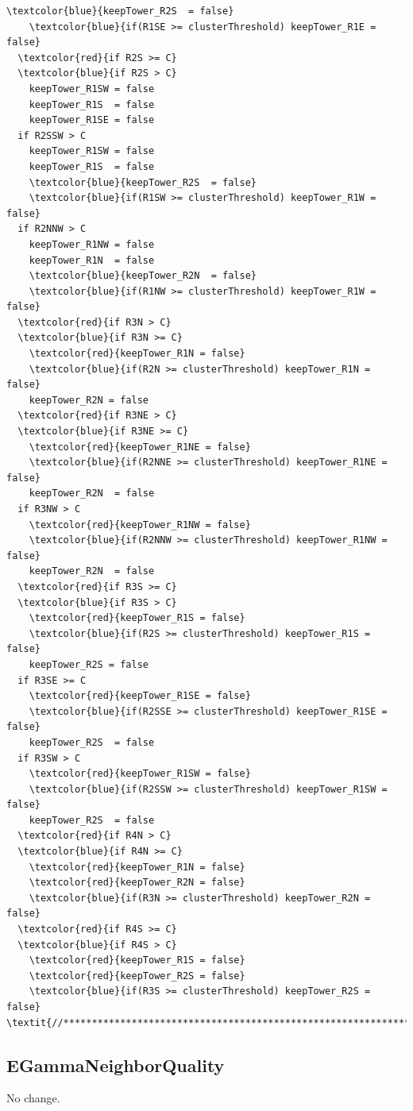 \documentclass[a4paper, 12pt]{article}
\begin{document}
\begin{Verbatim}[label={Sharing updates}]
    \textcolor{blue}{keepTower_R2S  = false}
    \textcolor{blue}{if(R1SE >= clusterThreshold) keepTower_R1E = false}
  \textcolor{red}{if R2S >= C}
  \textcolor{blue}{if R2S > C}
    keepTower_R1SW = false
    keepTower_R1S  = false
    keepTower_R1SE = false
  if R2SSW > C
    keepTower_R1SW = false
    keepTower_R1S  = false
    \textcolor{blue}{keepTower_R2S  = false}
    \textcolor{blue}{if(R1SW >= clusterThreshold) keepTower_R1W = false}
  if R2NNW > C
    keepTower_R1NW = false
    keepTower_R1N  = false
    \textcolor{blue}{keepTower_R2N  = false}
    \textcolor{blue}{if(R1NW >= clusterThreshold) keepTower_R1W = false}
  \textcolor{red}{if R3N > C}
  \textcolor{blue}{if R3N >= C}
    \textcolor{red}{keepTower_R1N = false}
    \textcolor{blue}{if(R2N >= clusterThreshold) keepTower_R1N = false}
    keepTower_R2N = false
  \textcolor{red}{if R3NE > C}
  \textcolor{blue}{if R3NE >= C}
    \textcolor{red}{keepTower_R1NE = false}
    \textcolor{blue}{if(R2NNE >= clusterThreshold) keepTower_R1NE = false}
    keepTower_R2N  = false
  if R3NW > C
    \textcolor{red}{keepTower_R1NW = false}
    \textcolor{blue}{if(R2NNW >= clusterThreshold) keepTower_R1NW = false}
    keepTower_R2N  = false
  \textcolor{red}{if R3S >= C}
  \textcolor{blue}{if R3S > C}
    \textcolor{red}{keepTower_R1S = false}
    \textcolor{blue}{if(R2S >= clusterThreshold) keepTower_R1S = false}
    keepTower_R2S = false
  if R3SE >= C
    \textcolor{red}{keepTower_R1SE = false}
    \textcolor{blue}{if(R2SSE >= clusterThreshold) keepTower_R1SE = false}
    keepTower_R2S  = false
  if R3SW > C
    \textcolor{red}{keepTower_R1SW = false}
    \textcolor{blue}{if(R2SSW >= clusterThreshold) keepTower_R1SW = false}
    keepTower_R2S  = false
  \textcolor{red}{if R4N > C}
  \textcolor{blue}{if R4N >= C}
    \textcolor{red}{keepTower_R1N = false}
    \textcolor{red}{keepTower_R2N = false}
    \textcolor{blue}{if(R3N >= clusterThreshold) keepTower_R2N = false}
  \textcolor{red}{if R4S >= C}
  \textcolor{blue}{if R4S > C}
    \textcolor{red}{keepTower_R1S = false}
    \textcolor{red}{keepTower_R2S = false}
    \textcolor{blue}{if(R3S >= clusterThreshold) keepTower_R2S = false}
\textit{//******************************************************************//}
\end{Verbatim}

\subsection{EGammaNeighborQuality}
No change.
\end{document}
